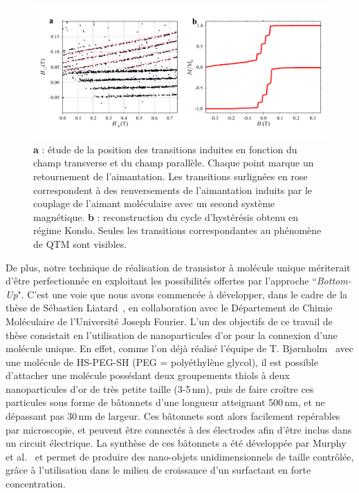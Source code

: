 \begin{figure}[h!]
\includegraphics[scale=0.45]{Conclusion/TranInd/TransInd.pdf} 
\caption{\textbf{a} : étude de la position des transitions induites en fonction du champ transverse et du champ parallèle. Chaque point marque un retournement de l'aimantation. Les transitions surlignées en rose correspondent à des renversements de l'aimantation induits par le couplage de l'aimant moléculaire avec un second système magnétique. \textbf{b} : reconstruction du cycle d'hystérésis obtenu en régime Kondo. Seules les transitions correspondantes au phénomène de QTM sont visibles.}
\label{TransIndConcl}
\end{figure}


De plus, notre technique de réalisation de transistor à molécule unique mériterait d’être perfectionnée en exploitant les possibilités offertes par l’approche ``\textit{Bottom-Up}". C'est une voie que nous avons commencée à développer, dans le cadre de la thèse de Sébastien Liatard~\cite{Liatard2012}, en collaboration avec le Département de Chimie Moléculaire de l’Université Joseph Fourier. L’un des objectifs de ce travail de thèse consistait en l’utilisation de nanoparticules d'or pour la connexion d’une molécule unique. En effet, comme l'on déjà réalisé l'équipe de T. Bjørnholm~\cite{Jain2009} avec une molécule de HS-PEG-SH (PEG = polyéthylène glycol), il est possible d'attacher une molécule possédant deux groupements thiols à deux nanoparticules d'or de très petite taille (3-5\,nm), puis de faire croître ces particules sous forme de bâtonnets d'une longueur atteignant 500\,nm, et ne dépassant pas 30\,nm de largeur. Ces bâtonnets sont alors facilement repérables par microscopie, et peuvent être connectés à des électrodes afin d'être inclus dans un circuit électrique. La synthèse de ces bâtonnets a été développée par Murphy et al.~\cite{Murphy2006} et permet de produire des nano-objets unidimensionnels de taille contrôlée, grâce à l'utilisation dans le milieu de croissance d'un surfactant en forte concentration. 


